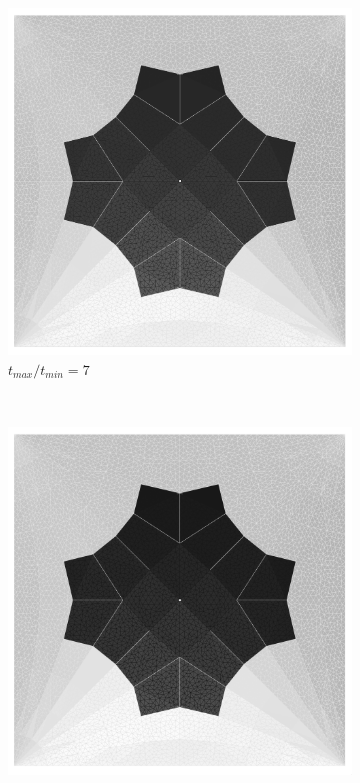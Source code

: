 \begin{figure}[H]
\begin{subfigure}[b]{.32\textwidth}
  \centering
  \includegraphics[width=.99\linewidth]{images/t_opt_l2d10_gamma7}
  \caption{$t_{max}/t_{min}=7$}
\end{subfigure}
~
\begin{subfigure}[b]{.32\textwidth}
  \centering
  \includegraphics[width=.99\linewidth]{images/t_opt_l2d10_gamma8}

\end{subfigure}
\end{figure}
